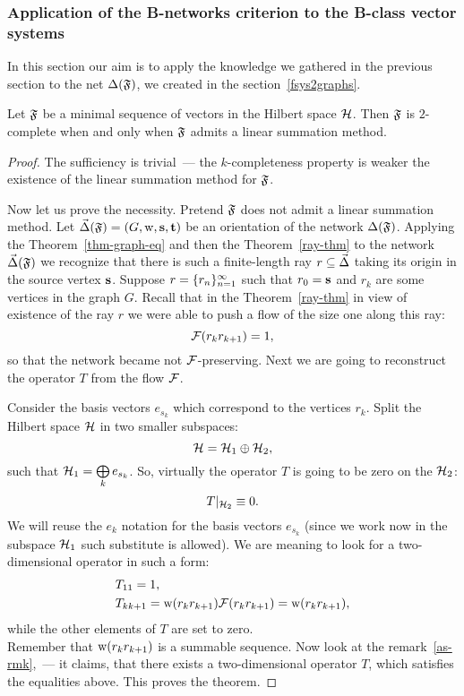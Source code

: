 \documentclass[12pt]{article}
\begin{document}
    \subsubsection{Application of the B-networks criterion to the B-class vector systems}
      In this section our aim is to apply the knowledge we gathered in the previous section to
      the net $\net(\fsys)$, we created in the section~\ref{fsys2graphs}.
      \begin{theorem}
        \label{completeness-thm}
        Let $\fsys$ be a minimal sequence of vectors in the Hilbert space $\cal{H}$.
        Then $\fsys$ is $2$-complete when and only when $\fsys$ admits a linear summation method.
      \end{theorem}
      \begin{proof}
        The sufficiency is trivial~--- the $k$-completeness property is weaker the existence of the linear summation method
          for $\fsys$.

        Now let us prove the necessity.
        Pretend $\fsys$ does not admit a linear summation method.
        Let $\onet(\fsys) = (G, \wtp, \source, \sink)$ be an orientation of the network $\net(\fsys)$.
        Applying the Theorem~\ref{thm-graph-eq} and then the Theorem~\ref{ray-thm} to the network $\onet(\fsys)$
          we recognize that there is such a finite-length ray $r \subseteq \onet$ taking its origin
          in the source vertex $\source$.
        Suppose $r = \seq{r}$ such that $r_0 = \source$ and $r_k$ are some vertices in the graph $G$.
        Recall that in the Theorem~\ref{ray-thm} in view of existence of the ray $r$ we were able to push
          a flow of the size one along this ray:
        \[
          \flowpos(r_k r_{k+1}) = 1,
        \]
        so that the network became not $\flowpos$-preserving.
        Next we are going to reconstruct the operator $T$ from the flow $\flowpos$.

        Consider the basis vectors $e_{s_k}$ which correspond to the vertices $r_k$.
        Split the Hilbert space $\cal{H}$ in two smaller subspaces:
        \[
          \cal{H} = \cal{H}_1 \oplus \cal{H}_2,
        \]
        such that $\cal{H}_1 = \bigoplus\limits_k e_{s_k}$.
        So, virtually the operator $T$ is going to be zero on the $\cal{H}_2$:
        \[
          T\vert_{\cal{H}_2} \equiv 0.
        \]
        We will reuse the $e_k$ notation for the basis vectors $e_{s_k}$ (since we work now in the subspace $\cal{H}_1$
          such substitute is allowed).
        We are meaning to look for a two-dimensional operator in such a form:
        \begin{align*}
          &T_{11} = 1,\\
          &T_{k k+1} = \wtp(r_k r_{k+1}) \flowpos(r_k r_{k+1}) = \wtp(r_k r_{k+1}),
        \end{align*}
        while the other elements of $T$ are set to zero.\\
        Remember that $\wtp(r_k r_{k+1})$ is a summable sequence.
        Now look at the remark~\ref{as-rmk},~--- it claims, that there exists a two-dimensional operator $T$, which satisfies the equalities above.
        This proves the theorem.
    \end{proof}
\end{document}
